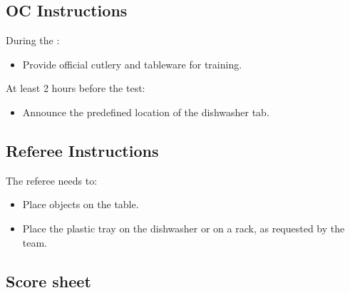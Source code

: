 \subsection*{OC Instructions}

During the \SetupDays:
\begin{itemize}
	\item Provide official cutlery and tableware for training.
\end{itemize}
At least 2 hours before the test:
\begin{itemize}
	\item Announce the predefined location of the dishwasher tab.
\end{itemize}


\subsection*{Referee Instructions}

The referee needs to:
\begin{itemize}
	\item Place objects on the table.
	\item Place the plastic tray on the dishwasher or on a rack, as requested by the team.
\end{itemize}

\subsection*{Score sheet}



